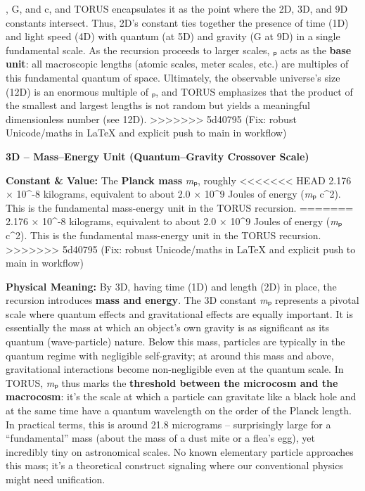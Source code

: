 \documentclass[]{article}
\begin{document}
\hbar, G, and c, and TORUS encapsulates it as the point where the 2D, 3D,
and 9D constants intersect. Thus, 2D's constant ties together the
presence of time (1D) and light speed (4D) with quantum (\hbar at 5D) and
gravity (G at 9D) in a single fundamental scale​. As the recursion
proceeds to larger scales, \emph{\ell}ₚ acts as the \textbf{base unit}: all
macroscopic lengths (atomic scales, meter scales, etc.) are multiples of
this fundamental quantum of space. Ultimately, the observable universe's
size (12D) is an enormous multiple of \emph{\ell}ₚ, and TORUS emphasizes
that the product of the smallest and largest lengths is not random but
yields a meaningful dimensionless number (see 12D)​.
>>>>>>> 5d40795 (Fix: robust Unicode/maths in LaTeX and explicit push to main in workflow)

\textbf{3D -- Mass--Energy Unit (Quantum--Gravity Crossover Scale)}

\textbf{Constant \& Value:} The \textbf{Planck mass} \emph{m}ₚ, roughly
<<<<<<< HEAD
2.176 × 10\^{}-8 kilograms\hspace{0pt}, equivalent to about 2.0 ×
10\^{}9 Joules of energy (\emph{m}ₚ c\^{}2). This is the fundamental
mass-energy unit in the TORUS recursion.
=======
2.176 × 10\^{}-8 kilograms​, equivalent to about 2.0 × 10\^{}9 Joules of
energy (\emph{m}ₚ c\^{}2). This is the fundamental mass-energy unit in
the TORUS recursion.
>>>>>>> 5d40795 (Fix: robust Unicode/maths in LaTeX and explicit push to main in workflow)

\textbf{Physical Meaning:} By 3D, having time (1D) and length (2D) in
place, the recursion introduces \textbf{mass and energy}. The 3D
constant \emph{m}ₚ represents a pivotal scale where quantum effects and
gravitational effects are equally important. It is essentially the mass
at which an object's own gravity is as significant as its quantum
(wave-particle) nature​. Below this mass, particles are typically in the
quantum regime with negligible self-gravity; at around this mass and
above, gravitational interactions become non-negligible even at the
quantum scale. In TORUS, \emph{m}ₚ thus marks the \textbf{threshold
between the microcosm and the macrocosm}​: it's the scale at which a
particle can gravitate like a black hole and at the same time have a
quantum wavelength on the order of the Planck length. In practical
terms, this is around 21.8 micrograms -- surprisingly large for a
``fundamental'' mass (about the mass of a dust mite or a flea's egg),
yet incredibly tiny on astronomical scales​. No known elementary
particle approaches this mass; it's a theoretical construct signaling
where our conventional physics might need unification.
\end{document}

